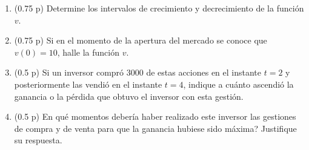 \documentclass[11pt]{article}
\begin{document}
\begin{enumerate}
   \item[(a)] (0.75 p) Determine los intervalos de crecimiento y decrecimiento de la función \(v\).
  \item[(b)] (0.75 p) Si en el momento de la apertura del mercado se conoce que \(v(0) = 10\), halle la función \(v\).
 \item[(c)] (0.5 p) Si un inversor compró 3000 de estas acciones en el instante \(t = 2\) y posteriormente las vendió en el instante \(t = 4\), indique a cuánto ascendió la ganancia o la pérdida que obtuvo el inversor con esta gestión.
\item[(d)] (0.5 p) \textquestiondown{}En qué momentos debería haber realizado este inversor las gestiones de compra y de venta para que la ganancia hubiese sido máxima? Justifique su respuesta.
\end{enumerate}
\end{document}
